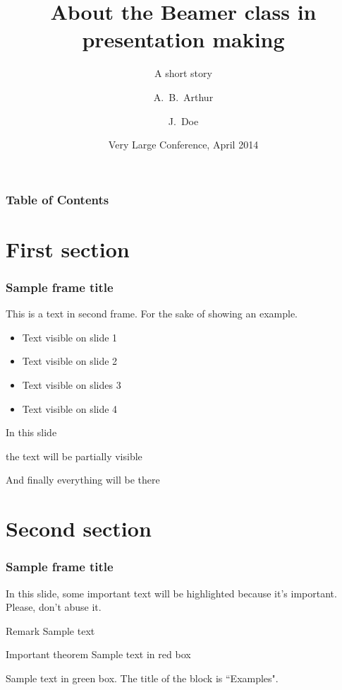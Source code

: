 \documentclass{beamer}
\title[About Beamer] %
{About the Beamer class in presentation making}
\subtitle{A short story}
\author[Arthur, Doe] %
{A.~B.~Arthur\inst{1} \and J.~Doe\inst{2}}
\institute[VFU] %
{
  \inst{1}%
  Faculty of Physics\\
  Very Famous University
  \and
  \inst{2}%
  Faculty of Chemistry\\
  Very Famous University
}
\date[VLC 2014] %
{Very Large Conference, April 2014}
\begin{document}
\frame{\titlepage}


\begin{frame}
\frametitle{Table of Contents}
\tableofcontents
\end{frame}


\section{First section}

\begin{frame}
\frametitle{Sample frame title}
This is a text in second frame. For the sake of showing an example.

\begin{itemize}
    \item<1-> Text visible on slide 1
    \item<2-> Text visible on slide 2
    \item<3> Text visible on slides 3
    \item<4-> Text visible on slide 4
\end{itemize}
\end{frame}



\begin{frame}
In this slide \pause

the text will be partially visible \pause

And finally everything will be there
\end{frame}

\section{Second section}

\begin{frame}
\frametitle{Sample frame title}

In this slide, some important text will be
\alert{highlighted} because it's important.
Please, don't abuse it.

\begin{block}{Remark}
Sample text
\end{block}

\begin{alertblock}{Important theorem}
Sample text in red box
\end{alertblock}

\begin{examples}
Sample text in green box. The title of the block is ``Examples".
\end{examples}
\end{frame}
\end{document}
